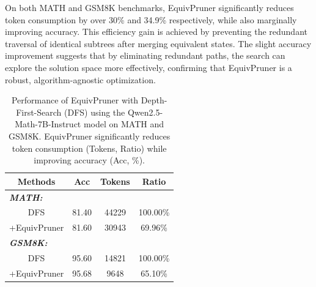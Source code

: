 \documentclass[11pt]{article}
\begin{document}
On both MATH and GSM8K benchmarks, EquivPruner significantly reduces token consumption by over 30\% and 34.9\% respectively, while also marginally improving accuracy. This efficiency gain is achieved by preventing the redundant traversal of identical subtrees after merging equivalent states. The slight accuracy improvement suggests that by eliminating redundant paths, the search can explore the solution space more effectively, confirming that EquivPruner is a robust, algorithm-agnostic optimization.
\begin{table}[t]
\centering
\caption{Performance of EquivPruner with Depth-First-Search (DFS) using the Qwen2.5-Math-7B-Instruct model on MATH and GSM8K. EquivPruner significantly reduces token consumption (Tokens, Ratio) while improving accuracy (Acc, \%).}
\label{tab:dfs}
\begin{tabular}{cccc}
\hline
Methods                                      & Acc                  & Tokens                        & Ratio                \\ \hline
\multicolumn{1}{l}{\textit{\textbf{MATH:}}}  & \multicolumn{1}{l}{} & \multicolumn{1}{l}{\textbf{}} & \multicolumn{1}{l}{} \\
DFS                                          & 81.40                & 44229                & 100.00\%             \\
\multicolumn{1}{r}{+EquivPruner}             & 81.60                & 30943                & 69.96\%              \\ \hline
\multicolumn{1}{l}{\textit{\textbf{GSM8K:}}} & \multicolumn{1}{l}{} & \multicolumn{1}{l}{}          & \multicolumn{1}{l}{} \\
DFS                                          & 95.60                & 14821                         & 100.00\%             \\
\multicolumn{1}{r}{+EquivPruner}             & 95.68                & 9648                          & 65.10\%              \\ \hline
\end{tabular}
\end{table}
\end{document}
